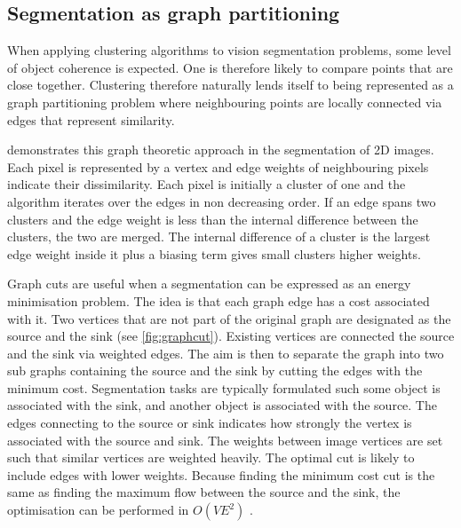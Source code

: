 
\subsection{Segmentation as graph partitioning}

When applying clustering algorithms to vision segmentation problems, some level of object coherence is expected. One is therefore likely to compare points that are close together. Clustering therefore naturally lends itself to being represented as a graph partitioning problem where neighbouring points are locally connected via edges that represent similarity.


\citet{Felzenszwalb2004} demonstrates this graph theoretic approach in the segmentation of 2D images. Each pixel is represented by a vertex and edge weights of neighbouring pixels indicate their dissimilarity. Each pixel is initially a cluster of one and the algorithm iterates over the edges in non decreasing order. If an edge spans two clusters and the edge weight is less than the internal difference between the clusters, the two are merged. The internal difference of a cluster is the largest edge weight inside it plus a biasing term gives small clusters higher weights.

Graph cuts are useful when a segmentation can be expressed as an energy minimisation problem. The idea is that each graph edge has a cost associated with it. Two vertices that are not part of the original graph are designated as the source and the sink (see \autoref{fig:graphcut}). Existing vertices are connected the source and the sink via weighted edges. The aim is then to separate the graph into two sub graphs containing the source and the sink by cutting the edges with the minimum cost. Segmentation tasks are typically formulated such some object is associated with the sink, and another object is associated with the source. The edges connecting to the source or sink indicates how strongly the vertex is associated with the source and sink. The weights between image vertices are set such that similar vertices are weighted heavily. The optimal cut is likely to include edges with lower weights. Because finding the minimum cost cut is the same as finding the maximum flow between the source and the sink, the optimisation can be performed in $O(VE^2)$ \cite{Edmonds1972}.


